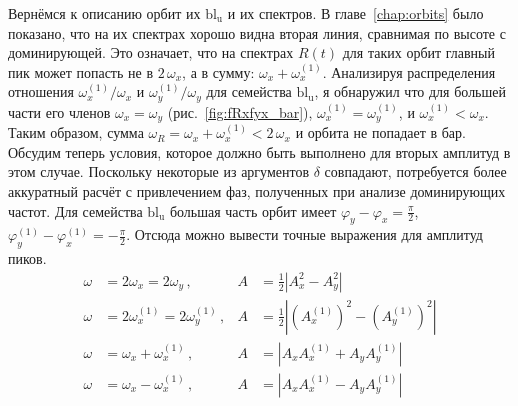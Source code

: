 \documentclass[tikz]{trlnotes}
\begin{document}
Вернёмся к описанию орбит их $\text{bl}_\text{u}$ и их спектров. В главе~\ref{chap:orbits} было показано, что на
их спектрах хорошо видна вторая линия, сравнимая по высоте с доминирующей. Это означает, что на спектрах $R(t)$
для таких орбит главный пик может попасть не в $2\,ω_x$, а в сумму: $ω_x + ω_{x}^{(1)}$. Анализируя распределения
отношения $ω_x^{(1)}/ω_x$ и $ω_y^{(1)}/ω_y$ для семейства $\text{bl}_\text{u}$, я обнаружил что для большей части
его членов $ω_x = ω_y$ (рис.~\ref{fig:fRxfyx_bar}), $ω_x^{(1)} = ω_y^{(1)}$, и
$ω_x^{(1)} < ω_x$. Таким образом, сумма $ω_R = ω_x + ω_x^{(1)} < 2\, ω_x$ и орбита не попадает в бар. 
Обсудим теперь условия, которое должно быть выполнено для вторых амплитуд в этом случае.
Поскольку некоторые из аргументов $δ$ совпадают, потребуется более аккуратный расчёт с привлечением
фаз, полученных при анализе доминирующих частот. Для семейства $\text{bl}_\text{u}$ большая часть орбит имеет
$φ_y - φ_x = \frac{\pi}{2}$, $φ_y^{(1)} - φ_x^{(1)} = -\frac{\pi}{2}$. Отсюда можно вывести точные выражения для
амплитуд пиков.
\begin{subequations}
\begin{align}
  ω &= 2ω_x = 2ω_y\,, & A &= \tfrac 12 \left|A_x^2 - A_y^2\right| \\
  ω &= 2ω_x^{(1)} = 2ω_y^{(1)}\,, & A &= \tfrac 12 \left| \left(A_x^{(1)}\right)^2-\left(A_y^{(1)}\right)^2\right|\\
  ω &= ω_x + ω_x^{(1)} \,, & A &= \left|A_xA_x^{(1)} + A_yA_y^{(1)} \right|\label{eq:freqsum}\\
  ω &= ω_x - ω_x^{(1)} \,, & A &= \left|A_xA_x^{(1)} - A_yA_y^{(1)} \right|
\end{align}
\end{subequations}
\end{document}
